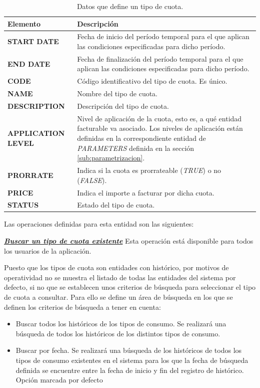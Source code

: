 \begin{table}[H]
  \centering
  \setlength{\leftmargini}{0.4cm}
  \resizebox{14cm}{!} {
  \begin{tabular}{|m{3cm} m{11cm}|}
  \rowcolor{udcpink!25}
  \hline
  	\textbf{Elemento} & \textbf{Descripción} \\\hline
  	\textbf{START DATE} & Fecha de inicio del período temporal para el que aplican las condiciones especificadas para dicho período.\\
  	\textbf{END DATE} & Fecha de finalización del período temporal para el que aplican las condiciones especificadas para dicho período.\\
  	\textbf{CODE} & Código identificativo del tipo de cuota. Es único.\\
	\textbf{NAME} & Nombre del tipo de cuota.\\
	\textbf{DESCRIPTION} & Descripción del tipo de cuota.\\
	\textbf{APPLICATION LEVEL} & Nivel de aplicación de la cuota, esto es, a qué entidad facturable va asociado. Los niveles de aplicación están definidas en la correspondiente entidad de \emph{PARAMETERS} definida en la sección \ref{sub:parametrizacion}.\\	
	\textbf{PRORRATE} & Indica si la cuota es prorrateable (\textit{TRUE}) o no (\textit{FALSE}).\\
	\textbf{PRICE} & Indica el importe a facturar por dicha cuota.\\
	\textbf{STATUS} & Estado del tipo de cuota.	
	\\\hline
  \end{tabular}
  } %
  \caption{Datos que define un tipo de cuota.}
  \label{tab:tipo-cuota}
\end{table}



Las operaciones definidas para esta entidad son las siguientes:

\underline{\textsl{\textbf{Buscar un tipo de cuota existente}}}\newline
Esta operación está disponible para todos los usuarios de la aplicación.

Puesto que los tipos de cuota son entidades con histórico, por motivos de operatividad no se muestra el listado de todas las entidades del sistema por defecto, si no que se establecen unos criterios de búsqueda para seleccionar el tipo de cuota a consultar. Para ello se define un área de búsqueda en los que se definen los criterios de búsqueda a tener en cuenta:
\begin{itemize}
\item Buscar todos los históricos de los tipos de consumo. Se realizará una búsqueda de todos los históricos de los distintos tipos de consumo.
\item Buscar por fecha. Se realizará una búsqueda de los históricos de todos los tipos de consumo existentes en el sistema para los que la fecha de búsqueda definida se encuentre entre la fecha de inicio y fin del registro de histórico. Opción marcada por defecto
\end{itemize}

